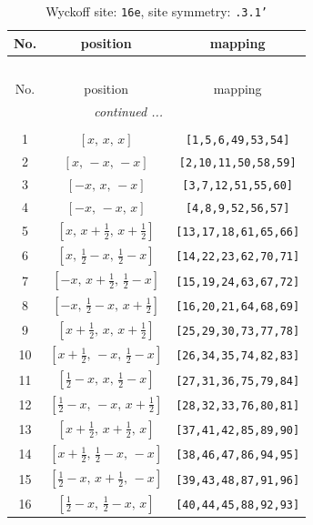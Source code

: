 \documentclass[fleqn,8pt]{jsarticle}
\begin{document}
\begin{longtable}{ccc}
\caption{Wyckoff site: {\tt 16e}, site symmetry: {\tt .3.1'}}
 \\
 \hline \hline
No. & position & mapping \\ \hline \endfirsthead

\multicolumn{2}{l}{\tablename\ \thetable{}} \\
 \hline \hline
No. & position & mapping \\ \hline \endhead

 \hline \hline
\multicolumn{2}{r}{\footnotesize\it continued ...} \\ \endfoot

 \hline \hline
\multicolumn{2}{r}{} \\ \endlastfoot

1 & $\left[ x,\, x,\, x \right]$ & {\tt [1,5,6,49,53,54]} \\ \hline
2 & $\left[ x,\, - x,\, - x \right]$ & {\tt [2,10,11,50,58,59]} \\ \hline
3 & $\left[ - x,\, x,\, - x \right]$ & {\tt [3,7,12,51,55,60]} \\ \hline
4 & $\left[ - x,\, - x,\, x \right]$ & {\tt [4,8,9,52,56,57]} \\ \hline
5 & $\left[ x,\, x + \frac{1}{2},\, x + \frac{1}{2} \right]$ & {\tt [13,17,18,61,65,66]} \\ \hline
6 & $\left[ x,\, \frac{1}{2} - x,\, \frac{1}{2} - x \right]$ & {\tt [14,22,23,62,70,71]} \\ \hline
7 & $\left[ - x,\, x + \frac{1}{2},\, \frac{1}{2} - x \right]$ & {\tt [15,19,24,63,67,72]} \\ \hline
8 & $\left[ - x,\, \frac{1}{2} - x,\, x + \frac{1}{2} \right]$ & {\tt [16,20,21,64,68,69]} \\ \hline
9 & $\left[ x + \frac{1}{2},\, x,\, x + \frac{1}{2} \right]$ & {\tt [25,29,30,73,77,78]} \\ \hline
10 & $\left[ x + \frac{1}{2},\, - x,\, \frac{1}{2} - x \right]$ & {\tt [26,34,35,74,82,83]} \\ \hline
11 & $\left[ \frac{1}{2} - x,\, x,\, \frac{1}{2} - x \right]$ & {\tt [27,31,36,75,79,84]} \\ \hline
12 & $\left[ \frac{1}{2} - x,\, - x,\, x + \frac{1}{2} \right]$ & {\tt [28,32,33,76,80,81]} \\ \hline
13 & $\left[ x + \frac{1}{2},\, x + \frac{1}{2},\, x \right]$ & {\tt [37,41,42,85,89,90]} \\ \hline
14 & $\left[ x + \frac{1}{2},\, \frac{1}{2} - x,\, - x \right]$ & {\tt [38,46,47,86,94,95]} \\ \hline
15 & $\left[ \frac{1}{2} - x,\, x + \frac{1}{2},\, - x \right]$ & {\tt [39,43,48,87,91,96]} \\ \hline
16 & $\left[ \frac{1}{2} - x,\, \frac{1}{2} - x,\, x \right]$ & {\tt [40,44,45,88,92,93]} \\
\end{longtable}
\end{document}
